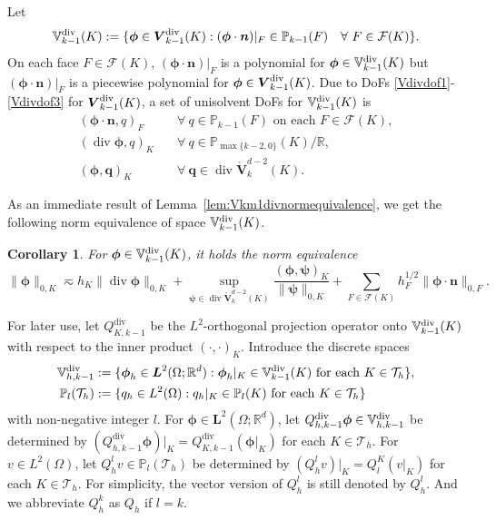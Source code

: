 \documentclass[10pt]{amsart}
\newtheorem{corollary}[theorem]{Corollary}
\renewcommand{\div}{\operatorname{div}}
\numberwithin{equation}{section}
\begin{document}
Let 
\[
\mathbb{V}_{k-1}^{\rm div}(K):=\{\boldsymbol{\phi}\in\boldsymbol{V}_{k-1}^{\rm div}(K): (\boldsymbol{\phi}\cdot\boldsymbol{n})|_F\in\mathbb P_{k-1}(F) \quad\forall~F\in\mathcal F(K)\}.
\]
On each face $F\in\mathcal F(K)$, $(\boldsymbol{\phi}\cdot\boldsymbol{n})|_F$ is a polynomial for $\boldsymbol{\phi}\in\mathbb{V}_{k-1}^{\rm div}(K)$ but $(\boldsymbol{\phi}\cdot\boldsymbol{n})|_F$ is a piecewise polynomial for $\boldsymbol{\phi}\in\boldsymbol{V}_{k-1}^{\rm div}(K)$.
Due to DoFs \eqref{Vdivdof1}-\eqref{Vdivdof3} for $\boldsymbol{V}_{k-1}^{\rm div}(K)$, a set of unisolvent DoFs for $\mathbb{V}_{k-1}^{\rm div}(K)$ is 
\begin{align}
    (\boldsymbol{\phi}\cdot\boldsymbol{n}, q)_F & \quad\forall~q\in\mathbb P_{k-1}(F) \textrm{ on each }  F\in\mathcal F(K), \label{Vpdivdof1}\\
    (\div\boldsymbol{\phi}, q)_K & \quad\forall~q\in\mathbb P_{\max\{k-2,0\}}(K)/\mathbb R, \label{Vpdivdof2} \\
    (\boldsymbol{\phi}, \boldsymbol{q})_K & \quad\forall~\boldsymbol{q}\in \div\mathring{\boldsymbol{V}}_{k}^{d-2}(K). \label{Vpdivdof3}
\end{align}

As an immediate result of Lemma~\ref{lem:Vkm1divnormequivalence}, we get the following norm equivalence of space $\mathbb{V}_{k-1}^{\rm div}(K)$.
\begin{corollary}
For $\boldsymbol{\phi}\in\mathbb{V}_{k-1}^{\rm div}(K)$, it holds the norm equivalence
\begin{equation}\label{eq:Vkm1divnormequiv}
\|\boldsymbol{\phi}\|_{0,K}\eqsim h_K\|\div\boldsymbol{\phi}\|_{0,K} + \sup_{\boldsymbol{\psi}\in\div\mathring{\boldsymbol{V}}_{k}^{d-2}(K)}\frac{(\boldsymbol{\phi}, \boldsymbol{\psi})_K}{\|\boldsymbol{\psi}\|_{0,K}} +\sum_{F\in\mathcal F(K)}h_F^{1/2}\|\boldsymbol{\phi}\cdot\boldsymbol{n}\|_{0,F}.
\end{equation}
\end{corollary}


For later use, let $Q_{K,k-1}^{\div}$ be the $L^2$-orthogonal projection operator onto $\mathbb{V}_{k-1}^{\rm div}(K)$ with respect to the inner product $(\cdot, \cdot)_K$.
Introduce the discrete spaces
\begin{align*}
\mathbb{V}_{h,k-1}^{\rm div}&:=\{\boldsymbol{\phi}_h\in \boldsymbol{L}^2(\Omega;\mathbb R^d): \boldsymbol{\phi}_h|_K\in \mathbb{V}_{k-1}^{\rm div}(K) \textrm{ for each } K\in\mathcal T_h\}, \\
\mathbb P_l(\mathcal T_h)&:=\{q_h\in L^2(\Omega): q_h|_K\in \mathbb P_l(K) \textrm{ for each } K\in\mathcal T_h\}
\end{align*}
with non-negative integer $l$.
For $\boldsymbol{\phi}\in\boldsymbol{L}^2(\Omega;\mathbb R^d)$, let $Q_{h,k-1}^{\div}\boldsymbol{\phi}\in\mathbb{V}_{h,k-1}^{\rm div}$ be determined by $(Q_{h,k-1}^{\div}\boldsymbol{\phi})|_K=Q_{K,k-1}^{\div}(\boldsymbol{\phi}|_K)$ for each $K\in\mathcal T_h$. For $v\in L^2(\Omega)$, let $Q_h^lv\in \mathbb P_l(\mathcal T_h)$ be determined by $(Q_h^{l}v)|_K=Q_{l}^K(v|_K)$ for each $K\in\mathcal T_h$. For simplicity, the vector version of $Q_h^l$ is still denoted by $Q_h^l$. And we abbreviate $Q_h^k$ as $Q_h$ if $l=k$.
\end{document}
